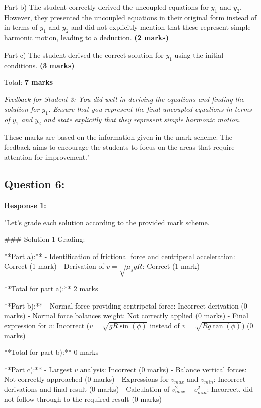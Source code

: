 \documentclass[a4paper,11pt]{article}
\begin{document}
Part b) The student correctly derived the uncoupled equations for \( y_{1} \) and \( y_{2} \). However, they presented the uncoupled equations in their original form instead of in terms of \( y_{1} \) and \( y_{2} \) and did not explicitly mention that these represent simple harmonic motion, leading to a deduction. \textbf{(2 marks)}

Part c) The student derived the correct solution for \( y_{1} \) using the initial conditions. \textbf{(3 marks)}

Total: \textbf{7 marks}

\emph{Feedback for Student 3: You did well in deriving the equations and finding the solution for \( y_{1} \). Ensure that you represent the final uncoupled equations in terms of \( y_{1} \) and \( y_{2} \) and state explicitly that they represent simple harmonic motion.}

These marks are based on the information given in the mark scheme. The feedback aims to encourage the students to focus on the areas that require attention for improvement."

\subsection*{Question 6:}

\textbf{Response 1:}

"Let's grade each solution according to the provided mark scheme.

### Solution 1 Grading:

**Part a):**
- Identification of frictional force and centripetal acceleration: Correct (1 mark)
- Derivation of \(v = \sqrt{\mu_s g R}\): Correct (1 mark)
  
**Total for part a):** 2 marks

**Part b):**
- Normal force providing centripetal force: Incorrect derivation (0 marks)
- Normal force balances weight: Not correctly applied (0 marks)
- Final expression for \(v\): Incorrect (\(v = \sqrt{gR\sin(\phi)}\) instead of \(v = \sqrt{Rg\tan(\phi)}\)) (0 marks)
  
**Total for part b):** 0 marks

**Part c):**
- Largest \(v\) analysis: Incorrect (0 marks)
- Balance vertical forces: Not correctly approached (0 marks)
- Expressions for \(v_{max}\) and \(v_{min}\): Incorrect derivations and final result (0 marks)
- Calculation of \(v_{max}^2 - v_{min}^2\): Incorrect, did not follow through to the required result (0 marks)
  
\end{document}
